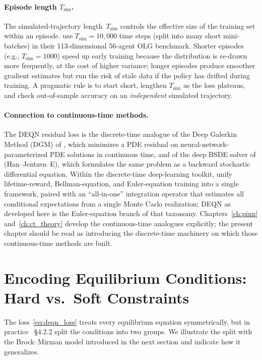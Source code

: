 \documentclass[11pt,a4paper]{report}
\begin{document}
\paragraph{Episode length $T_{\mathrm{sim}}$.}  The simulated-trajectory length~$T_{\mathrm{sim}}$ controls the effective size of the training set within an episode.  \citet{azinovicDEEPEQUILIBRIUMNETS2022} use $T_{\mathrm{sim}} = 10{,}000$ time steps (split into many short mini-batches) in their 113-dimensional 56-agent OLG benchmark.  Shorter episodes (e.g., $T_{\mathrm{sim}} = 1000$) speed up early training because the distribution is re-drawn more frequently, at the cost of higher variance; longer episodes produce smoother gradient estimates but run the risk of stale data if the policy has drifted during training.  A pragmatic rule is to start short, lengthen $T_{\mathrm{sim}}$ as the loss plateaus, and check out-of-sample accuracy on an \emph{independent} simulated trajectory.

\paragraph{Connection to continuous-time methods.}  The DEQN residual loss is the discrete-time analogue of the Deep Galerkin Method (DGM) of \citet{sirignano2018dgm}, which minimizes a PDE residual on neural-network-parameterized PDE solutions in continuous time, and of the deep BSDE solver of \citet{han2018solving} (Han--Jentzen--E), which formulates the same problem as a backward stochastic differential equation.  Within the discrete-time deep-learning toolkit, \citet{maliar2021deep} unify lifetime-reward, Bellman-equation, and Euler-equation training into a single framework, paired with an ``all-in-one'' integration operator that estimates all conditional expectations from a single Monte Carlo realization; DEQN as developed here is the Euler-equation branch of that taxonomy.  Chapters~\ref{ch:pinn} and~\ref{ch:ct_theory} develop the continuous-time analogues explicitly; the present chapter should be read as introducing the discrete-time machinery on which those continuous-time methods are built.

\section{Encoding Equilibrium Conditions: Hard vs.\ Soft Constraints}
\label{sec:deqn_hard_soft}

The loss~\eqref{eq:deqn_loss} treats every equilibrium equation symmetrically, but in practice \citet{azinovicDEEPEQUILIBRIUMNETS2022}~\S4.2.2 split the conditions into two groups.  We illustrate the split with the Brock--Mirman model introduced in the next section and indicate how it generalizes.
\end{document}
